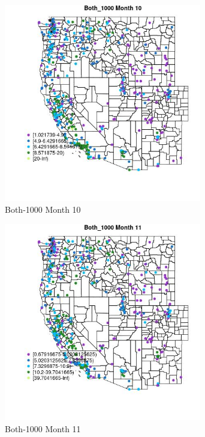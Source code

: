 \begin{figure} 
\centering  
\includegraphics[width=0.77\textwidth]{Code_Outputs/ML_input_report_ML_input_PM25_Step5_part_d_de_duplicated_aves_ML_input_MapObsMo10Both_1000.jpg} 
\caption{\label{fig:ML_input_report_ML_input_PM25_Step5_part_d_de_duplicated_aves_ML_inputMapObsMo10Both_1000}Both-1000 Month 10} 
\end{figure} 
 

\begin{figure} 
\centering  
\includegraphics[width=0.77\textwidth]{Code_Outputs/ML_input_report_ML_input_PM25_Step5_part_d_de_duplicated_aves_ML_input_MapObsMo11Both_1000.jpg} 
\caption{\label{fig:ML_input_report_ML_input_PM25_Step5_part_d_de_duplicated_aves_ML_inputMapObsMo11Both_1000}Both-1000 Month 11} 
\end{figure} 
 

